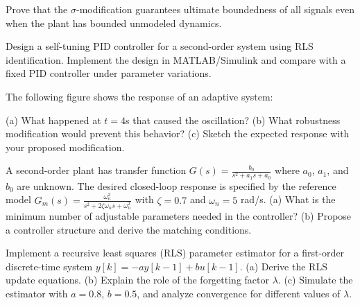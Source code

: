 \begin{exercise}
Prove that the $\sigma$-modification guarantees ultimate boundedness of all signals even when the plant has bounded unmodeled dynamics.
\end{exercise}

\begin{exercise}
Design a self-tuning PID controller for a second-order system using RLS identification. Implement the design in MATLAB/Simulink and compare with a fixed PID controller under parameter variations.
\end{exercise}

\begin{exercise}
The following figure shows the response of an adaptive system:

\begin{center}
\end{center}

(a) What happened at $t = 4$s that caused the oscillation? (b) What robustness modification would prevent this behavior? (c) Sketch the expected response with your proposed modification.
\end{exercise}

\begin{exercise}
A second-order plant has transfer function $G(s) = \frac{b_0}{s^2 + a_1 s + a_0}$ where $a_0$, $a_1$, and $b_0$ are unknown. The desired closed-loop response is specified by the reference model $G_m(s) = \frac{\omega_n^2}{s^2 + 2\zeta\omega_n s + \omega_n^2}$ with $\zeta = 0.7$ and $\omega_n = 5$ rad/s. (a) What is the minimum number of adjustable parameters needed in the controller? (b) Propose a controller structure and derive the matching conditions.
\end{exercise}

\begin{exercise}
Implement a recursive least squares (RLS) parameter estimator for a first-order discrete-time system $y[k] = -a y[k-1] + b u[k-1]$. (a) Derive the RLS update equations. (b) Explain the role of the forgetting factor $\lambda$. (c) Simulate the estimator with $a = 0.8$, $b = 0.5$, and analyze convergence for different values of $\lambda$.
\end{exercise}

